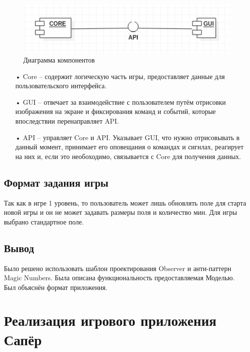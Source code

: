 \begin{figure}[H]
	\begin{center}
		\includegraphics[scale=0.7]{images/diagram1.jpg}
		\caption{Диаграмма компонентов} 
		\label{pic:pic_name} %
	\end{center}
\end{figure}

\begin{enumerate}
\item[•] Core -- содержит логическую часть игры, предоставляет данные для пользовательского интерфейса.
\item[•] GUI -- отвечает за взаимодействие с пользователем путём отрисовки изображения на экране и фиксирования команд и событий, которые впоследствии перенаправляет API.
\item[•] API -- управляет Core и API. Указывает GUI, что нужно отрисовывать в данный момент, принимает его оповещания о командах и сигнлах, реагирует на них и, если это необоходимо, связывается с Core для получения данных. 
\end{enumerate}

\subsection{Формат задания игры}

Так как в игре 1 уровень, то пользователь может лишь обновлять поле для старта новой игры и он не может задавать размеры поля и количество мин. Для игры выбрано стандартное поле. 

\subsection{Вывод}

Было решено использовать шаблон проектирования Observer и анти-паттерн Magic Numbers. Была описана функциональность предоставляемая Моделью. Был объяснён формат приложения.

\section{Реализация игрового приложения Сапёр}

